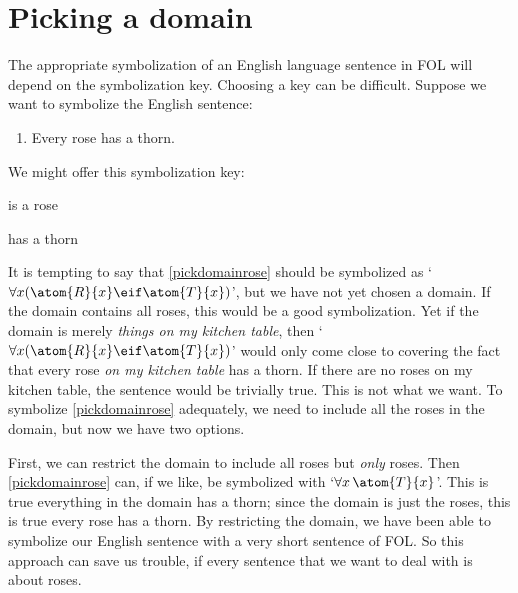 \section{Picking a domain}
The appropriate symbolization of an English language sentence in FOL will depend on the symbolization key. Choosing a key can be difficult. Suppose we want to symbolize the English sentence:
	\begin{enumerate}
		\item\label{pickdomainrose} Every rose has a thorn.
	\end{enumerate}
We might offer this symbolization key:
	\begin{ekey}
		\item[\atom{R}{x}]  is a rose
		\item[\atom{T}{x}]  has a thorn
	\end{ekey}
It is tempting to say that \cref*{pickdomainrose} should be symbolized as `$\forall x(\atom{R}{x} \eif \atom{T}{x})$', but we have not yet chosen a domain. If the domain contains all roses, this would be a good symbolization. Yet if the domain is merely \emph{things on my kitchen table}, then `$\forall x(\atom{R}{x} \eif \atom{T}{x})$' would only come close to covering the fact that every rose \emph{on my kitchen table} has a thorn. If there are no roses on my kitchen table, the sentence would be trivially true. This is not what we want. To symbolize \cref*{pickdomainrose} adequately, we need to include all the roses in the domain, but now we have two options.

First, we can restrict the domain to include all roses but \emph{only} roses. Then \cref*{pickdomainrose} can, if we like, be symbolized with `$\forall x\,\atom{T}{x}$'. This is true \ifeff{} everything in the domain has a thorn; since the domain is just the roses, this is true \ifeff{} every rose has a thorn. By restricting the domain, we have been able to symbolize our English sentence with a very short sentence of FOL. So this approach can save us trouble, if every sentence that we want to deal with is about roses.

